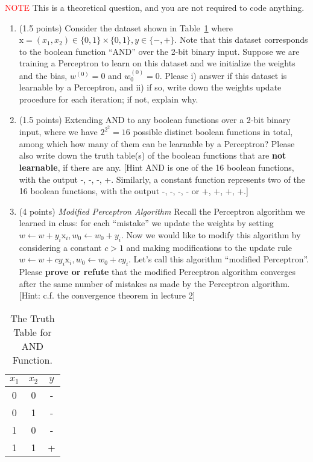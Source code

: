 \documentclass[10pt,letter,notitlepage]{article}
\newcommand{\blue}[1]{{\color{blue}#1}}
\newcommand{\bits}{\{ 0, 1 \}}
\newcounter{exercise}
\begin{document}
\begin{exercise}
\textcolor{red}{NOTE} This is a theoretical question, and you are not required to code anything. 
\begin{enumerate}
    \item (1.5 points) Consider the dataset shown in Table~\ref{tab:and} where $\text{x} = (x_1, x_2) \in \bits \times \bits, y \in \{ -, + \}$. Note that this dataset corresponds to the boolean function ``AND'' over the 2-bit binary input. Suppose we are training a Perceptron to learn on this dataset and we initialize the weights and the bias, $w^{(0)} = 0$ and $w^{(0)}_0=0$.
    Please i) answer if this dataset is learnable by a Perceptron, and ii) if so, write down the weights update procedure for each iteration; if not, explain why.
    
    \item (1.5 points) Extending AND to any boolean functions over a 2-bit binary input, where we have $2^{2^2} = 16$ possible distinct boolean functions in total, among which how many of them can be learnable by a Perceptron? Please also write down the truth table(s) of the boolean functions that are \textbf{not learnable}, if there are any. [\blue{Hint} AND is one of the 16 boolean functions, with the output -, -, -, +. Similarly, a constant function represents two of the 16 boolean functions, with the output -, -, -, - or +, +, +, +.]
    
    \item (4 points) \textit{Modified Perceptron Algorithm} Recall the Perceptron algorithm we learned in class: for each ``mistake'' we update the weights by setting $w \leftarrow w + y_i\text{x}_i, w_0 \leftarrow w_0 + y_i$. Now we would like to modify this algorithm by considering a constant $c > 1$ and making modifications to the update rule $w \leftarrow w + cy_i\text{x}_i, w_0 \leftarrow w_0 + cy_i$. Let's call this algorithm ``modified Perceptron''.    
    Please \textbf{prove or refute} that the modified Perceptron algorithm converges after the same number of mistakes as made by the Perceptron algorithm.
    [\blue{Hint:} c.f. the convergence theorem in lecture 2]
\end{enumerate}

\end{exercise}



\begin{table}[h]
        \centering
        \begin{tabular}{cc|c}
        $x_1$ & $x_2$ & $y$ \\ \hline
        0 & 0 & - \\
        0 & 1 & - \\
        1 & 0 & - \\
        1 & 1 & + \\
    \end{tabular}
         \caption{The Truth Table for AND Function.}
    \label{tab:and}
    \end{table}
\end{document}
